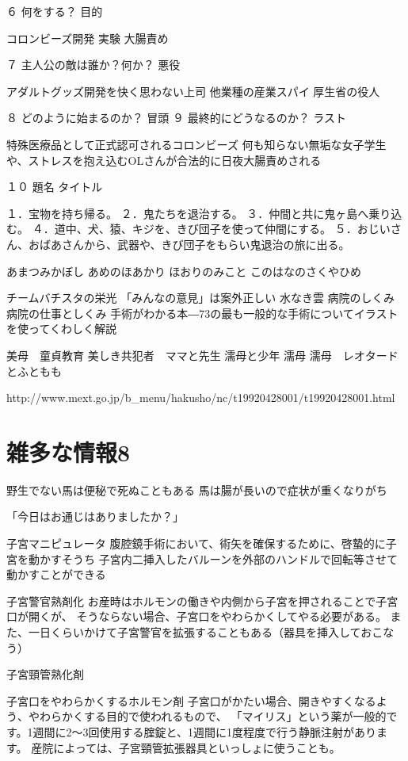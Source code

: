 ６	何をする？	目的

コロンビーズ開発
実験
大腸責め


７	主人公の敵は誰か？何か？	悪役

アダルトグッズ開発を快く思わない上司
他業種の産業スパイ
厚生省の役人


８	どのように始まるのか？	冒頭
９	最終的にどうなるのか？	ラスト

特殊医療品として正式認可されるコロンビーズ
何も知らない無垢な女子学生や、ストレスを抱え込むOLさんが合法的に日夜大腸責めされる


１０	題名	タイトル



１．宝物を持ち帰る。
２．鬼たちを退治する。
３．仲間と共に鬼ヶ島へ乗り込む。
４．道中、犬、猿、キジを、きび団子を使って仲間にする。
５．おじいさん、おばあさんから、武器や、きび団子をもらい鬼退治の旅に出る。




あまつみかぼし
あめのほあかり
ほおりのみこと
このはなのさくやひめ

チームバチスタの栄光
「みんなの意見」は案外正しい
水なき雲 
病院のしくみ
病院の仕事としくみ
手術がわかる本―73の最も一般的な手術についてイラストを使ってくわしく解説

美母　童貞教育
美しき共犯者　ママと先生
濡母と少年
濡母
濡母　レオタードとふともも

http://www.mext.go.jp/b_menu/hakusho/nc/t19920428001/t19920428001.html


\section{雑多な情報8}
野生でない馬は便秘で死ぬこともある
馬は腸が長いので症状が重くなりがち



「今日はお通じはありましたか？」


子宮マニピュレータ
腹腔鏡手術において、術矢を確保するために、啓蟄的に子宮を動かすそうち
子宮内二挿入したバルーンを外部のハンドルで回転等させて動かすことができる

子宮警官熟剤化
お産時はホルモンの働きや内側から子宮を押されることで子宮口が開くが、
そうならない場合、子宮口をやわらかくしてやる必要がある。
また、一日くらいかけて子宮警官を拡張することもある（器具を挿入しておこなう）

子宮頸管熟化剤

子宮口をやわらかくするホルモン剤
子宮口がかたい場合、開きやすくなるよう、やわらかくする目的で使われるもので、
「マイリス」という薬が一般的です。1週間に2～3回使用する腟錠と、1週間に1度程度で行う静脈注射があります。
産院によっては、子宮頸管拡張器具といっしょに使うことも。

